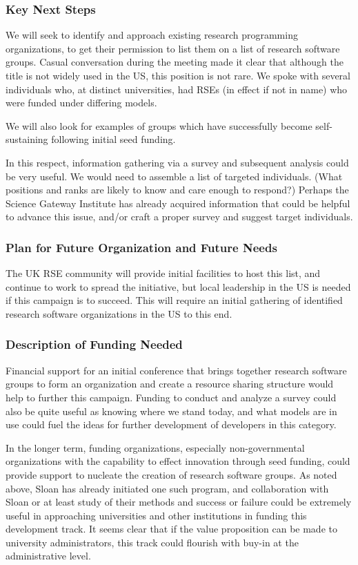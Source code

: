 \subsubsection{Key Next Steps}

We will seek to identify and approach existing research programming organizations,
to get their permission to list them on a list of research software groups.
Casual conversation during the meeting made it clear that although the title is
not widely used in the US, this position is not rare. We spoke with several
individuals who, at distinct universities, had RSEs (in effect if not in name)
who were funded under differing models.

We will also look for examples of groups which have successfully become self-
sustaining following initial seed funding.

In this respect, information gathering via a survey and subsequent analysis could be
very useful. We would need to assemble a list of targeted individuals. (What
positions and ranks are likely to know and care enough to respond?) Perhaps the
Science Gateway Institute has already acquired information that could be helpful
to advance this issue, and/or craft a proper survey and suggest target individuals.

\subsubsection{Plan for Future Organization and Future Needs}

The UK RSE community will provide initial facilities to host this list, and
continue to work to spread the initiative, but local leadership in the US is
needed if this campaign is to succeed. This will require an initial gathering of
identified research software organizations in the US to this end.

\subsubsection{Description of Funding Needed}

Financial support for an initial conference that brings together research software
groups to form an organization and create a resource sharing structure would
help to further this campaign. Funding to conduct and analyze a survey could
also be quite useful as knowing where we stand today, and what models are in use
could fuel the ideas for further development of developers in this category.

In the longer term, funding organizations, especially non-governmental
organizations with the capability to effect innovation through seed funding,
could provide support to nucleate the creation of research software groups. As
noted above, Sloan has already initiated one such program, and collaboration
with Sloan or at least study of their methods and success or failure could be
extremely useful in approaching universities and other institutions in funding
this development track. It seems clear that if the value proposition can be made
to university administrators, this track could flourish with buy-in at the
administrative level.

